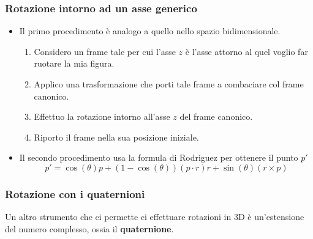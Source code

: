 \subsubsection{Rotazione intorno ad un asse generico}
\begin{itemize}
	\item Il primo procedimento \`e analogo a quello nello spazio bidimensionale.
	      \begin{enumerate}
		      \item Considero un frame tale per cui l'asse $z$ \`e l'asse attorno al quel
		            voglio far ruotare la mia figura.
		      \item Applico una trasformazione che porti tale frame a combaciare col frame
		            canonico.
		      \item Effettuo la rotazione intorno all'asse $z$ del frame canonico.
		      \item Riporto il frame nella sua posizione iniziale.
	      \end{enumerate}
	\item Il secondo procedimento usa la formula di Rodriguez per ottenere il punto $p'$
	      \[ p' = \cos(\theta) p + (1 - \cos(\theta))(p \cdot r) r + \sin(\theta)(r \times p) \]
\end{itemize}

\subsubsection{Rotazione con i quaternioni}
Un altro strumento che ci permette ci effettuare rotazioni in 3D \`e un'estensione del numero
complesso, ossia il \textbf{quaternione}.
